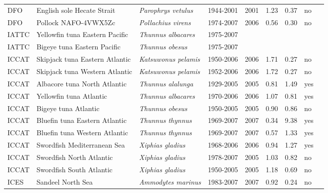 \begin{longtable}{p{1.8cm}p{4cm}p{4cm}ccccp{1.9cm}c}
  DFO & English sole Hecate Strait & \textit{Parophrys vetulus} & 1944-2001 & 2001 & 1.23 & 0.37 & no & \cite{Flat99.pdf} \\ 
  DFO & Pollock NAFO-4VWX5Zc & \textit{Pollachius virens} & 1974-2007 & 2006 & 0.56 & 0.30 & no & \cite{NAFO-POLL4VWX5Zc-2006.pdf} \\ 
  IATTC & Yellowfin tuna Eastern Pacific & \textit{Thunnus albacares} & 1975-2007 &  &  &  &  & \cite{SAR8-YFT-ENG.pdf} \\ 
  IATTC & Bigeye tuna Eastern Pacific & \textit{Thunnus obesus} & 1975-2007 &  &  &  &  & \cite{JENSEN_BETEPAC_2008.pdf} \\ 
  ICCAT & Skipjack tuna Eastern Atlantic & \textit{Katsuwonus pelamis} & 1950-2006 & 2006 & 1.71 & 0.27 & no & \cite{JENSEN_YFINATL-2008.pdf} \\ 
  ICCAT & Skipjack tuna Western Atlantic & \textit{Katsuwonus pelamis} & 1952-2006 & 2006 & 1.72 & 0.27 & no & \cite{JENSEN_YFINATL-2008.pdf} \\ 
  ICCAT & Albacore tuna North Atlantic & \textit{Thunnus alalunga} & 1929-2005 & 2005 & 0.81 & 1.49 & yes & \cite{2007-ALB-STOCK-ASSESS-REP.pdf} \\ 
  ICCAT & Yellowfin tuna Atlantic & \textit{Thunnus albacares} & 1970-2006 & 2006 & 1.07 & 0.81 & yes & \cite{JENSEN-YFINATL-2008.pdf} \\ 
  ICCAT & Bigeye tuna Atlantic & \textit{Thunnus obesus} & 1950-2005 & 2005 & 0.90 & 0.86 & no & \cite{JENSEN-BIGEYEATL-2008.pdf} \\ 
  ICCAT & Bluefin tuna Eastern Atlantic & \textit{Thunnus thynnus} & 1969-2007 & 2007 & 0.34 & 9.38 & yes & \cite{ref2008-BFT-STOCK-ASSESS-REP.pdf} \\ 
  ICCAT & Bluefin tuna Western Atlantic & \textit{Thunnus thynnus} & 1969-2007 & 2007 & 0.57 & 1.33 & yes & \cite{ref2008-BFT-STOCK-ASSESS-REP.pdf} \\ 
  ICCAT & Swordfish Mediterranean Sea & \textit{Xiphias gladius} & 1968-2006 & 2006 & 0.94 & 1.27 & yes & \cite{ICCAT-Mediterranean-Xiphiasgladius-2007.pdf} \\ 
  ICCAT & Swordfish North Atlantic & \textit{Xiphias gladius} & 1978-2007 & 2005 & 1.03 & 0.82 & no & \cite{JENSEN_SWORDSATL-2007.pdf} \\ 
  ICCAT & Swordfish South Atlantic & \textit{Xiphias gladius} & 1950-2005 & 2005 & 1.18 & 0.69 & no & \cite{JENSEN_SWORDSATL-2007.pdf} \\ 
  ICES & Sandeel North Sea & \textit{Ammodytes marinus} & 1983-2007 & 2007 & 0.92 & 0.24 & no & \cite{ICES-WGNSSK-2007.pdf} \\ 

\end{longtable}
